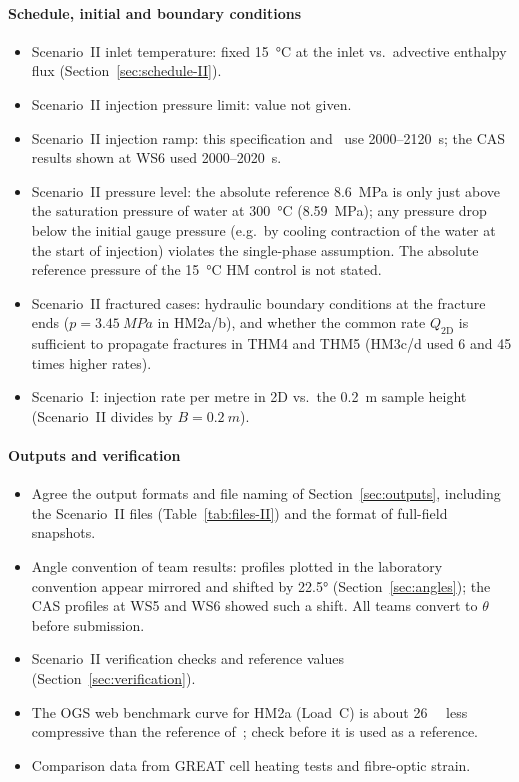 \documentclass[11pt,a4paper]{article}
\newcommand{\open}{$\square$}
\begin{document}
\begin{itemize}
\paragraph{Schedule, initial and boundary conditions}
\begin{itemize}[label=\open]
  \item Scenario~II inlet temperature: fixed \SI{15}{\celsius} at the inlet
        vs.\ advective enthalpy flux (Section~\ref{sec:schedule-II}).
  \item Scenario~II injection pressure limit: value not given.
  \item Scenario~II injection ramp: this specification and~\cite{Pan2026} use
        2000--\SI{2120}{s}; the CAS results shown at WS6 used 2000--\SI{2020}{s}.
  \item Scenario~II pressure level: the absolute reference \SI{8.6}{MPa} is only
        just above the saturation pressure of water at \SI{300}{\celsius}
        (\SI{8.59}{MPa}); any pressure drop below the initial gauge pressure
        (e.g.\ by cooling contraction of the water at the start of injection)
        violates the single-phase assumption. The absolute reference pressure
        of the \SI{15}{\celsius} HM control is not stated.
  \item Scenario~II fractured cases: hydraulic boundary conditions at the
        fracture ends ($p=\SI{3.45}{MPa}$ in HM2a/b), and whether the common
        rate $Q_\mathrm{2D}$ is sufficient to propagate fractures in THM4 and
        THM5 (HM3c/d used 6 and 45 times higher rates).
  \item Scenario~I: injection rate per metre in 2D vs.\ the \SI{0.2}{m} sample
        height (Scenario~II divides by $B=\SI{0.2}{m}$).
\end{itemize}

\paragraph{Outputs and verification}
\begin{itemize}[label=\open]
  \item Agree the output formats and file naming of Section~\ref{sec:outputs},
        including the Scenario~II files (Table~\ref{tab:files-II}) and the
        format of full-field snapshots.
  \item Angle convention of team results: profiles plotted in the laboratory
        convention appear mirrored and shifted by \ang{22.5}
        (Section~\ref{sec:angles}); the CAS profiles at WS5 and WS6 showed such
        a shift. All teams convert to $\theta$ before submission.
  \item Scenario~II verification checks and reference values
        (Section~\ref{sec:verification}).
  \item The OGS web benchmark curve for HM2a (Load~C) is about
        \SI{26}{\micro\epsilon} less compressive than the reference
        of~\cite{Mollaali2026}; check before it is used as a reference.
  \item Comparison data from GREAT cell heating tests and fibre-optic strain.
\end{itemize}


\end{itemize}
\end{document}
